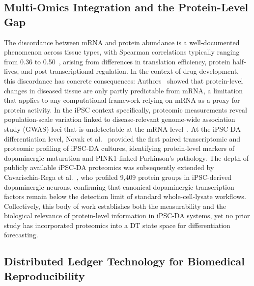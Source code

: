 \documentclass[5p,times,twocolumn]{elsarticle}
\newcommand{\rtag}[1]{}
\newcommand{\rev}[2]{\rtag{#1}#2}
\newcommand{\lang}[1]{#1}
\begin{document}
\subsection{\textbf{Multi-Omics Integration and the
    Protein-Level Gap}}

The discordance between mRNA and protein abundance
is a well-documented phenomenon across tissue types,
with Spearman correlations typically ranging from
0.36 to 0.50~\cite{kosti2016cross}, arising from
differences in translation efficiency, protein
half-lives, and post-transcriptional
regulation.
In the context of drug development, this discordance
has concrete consequences: \rev{AC}{Authors~\cite{tasaki2022inferring}
  showed that protein-level changes in diseased tissue are
  only partly predictable from mRNA, a limitation that
  applies to any computational framework relying on mRNA
  as a proxy for protein activity}.
In the iPSC context specifically, proteomic
measurements reveal population-scale variation
linked to disease-relevant \lang{genome-wide association study} (GWAS) loci that is
undetectable at the mRNA level~\cite{mirauta2020population}.
At the iPSC-DA differentiation level, Novak et al.\
\cite{novak2022single} provided the first paired
transcriptomic and proteomic profiling of iPSC-DA
cultures, identifying protein-level markers of
dopaminergic maturation and PINK1-linked
Parkinson's pathology.
The depth of publicly available iPSC-DA proteomics
was subsequently extended by Cavarischia-Rega et al.\
\cite{cavarischia2024proteome}, who profiled 9,409
protein groups in iPSC-derived dopaminergic neurons,
confirming that canonical dopaminergic transcription
factors remain below the detection limit of
standard whole-cell-lysate workflows.
Collectively, this body of work \lang{establishes} both the
measurability and the biological \lang{relevance} of
protein-level information in iPSC-DA systems,
yet no prior study has incorporated proteomics
into a DT state space for differentiation
forecasting.

\subsection{\textbf{Distributed Ledger Technology for
    Biomedical Reproducibility}}
\label{sec:rw_dlt}
\end{document}
